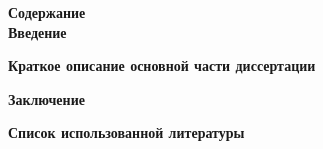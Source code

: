 \documentclass[a4paper,14pt]{extreport}
\begin{document}
\newpage
\noindent \large \textbf{Содержание} \\


\newpage
\noindent \large \textbf{Введение}

\newpage
\noindent \large \textbf{Краткое описание основной части диссертации}

\newpage
\noindent \large \textbf{Заключение}

\newpage
\noindent \large \textbf{Список использованной литературы}
\end{document}
